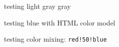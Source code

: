 \documentclass{article}
\begin{document}
testing
\color[cmyk]{.3,.3,.3,.2} light gray
\color[gray]{.3} gray

\textcolor[HTML]{5555FF}{testing blue with HTML color model}

\color{red!50!blue}
testing color mixing: \verb|red!50!blue|
\end{document}

